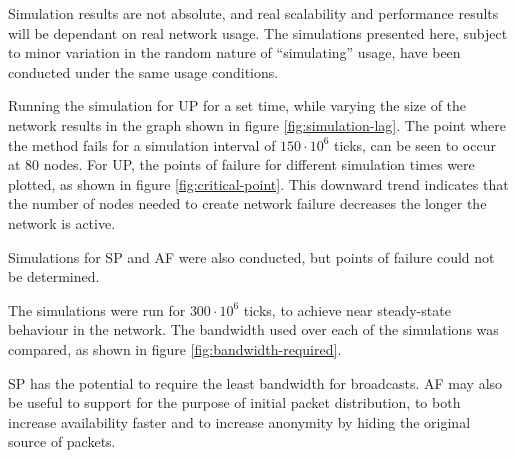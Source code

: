 			Simulation results are not absolute, and real scalability and performance results will be dependant on real network usage. The simulations presented here, subject to minor variation in the random nature of ``simulating'' usage, have been conducted under the same usage conditions.
			
			Running the simulation for UP for a set time, while varying the size of the network results in the graph shown in figure \ref{fig:simulation-lag}. The point where the method fails for a simulation interval of $150\cdot10^6$ ticks, can be seen to occur at 80 nodes. For UP, the points of failure for different simulation times were plotted, as shown in figure \ref{fig:critical-point}. This downward trend indicates that the number of nodes needed to create network failure decreases the longer the network is active.
			
			Simulations for SP and AF were also conducted, but points of failure could not be determined.
			
			The simulations were run for $300\cdot10^6$ ticks, to achieve near steady-state behaviour in the network. 
			The bandwidth used over each of the simulations was compared, as shown in figure \ref{fig:bandwidth-required}.
			
			SP has the potential to require the least bandwidth for broadcasts. AF may also be useful to support for the purpose of initial packet distribution, to both increase availability faster and to increase anonymity by hiding the original source of packets.
			